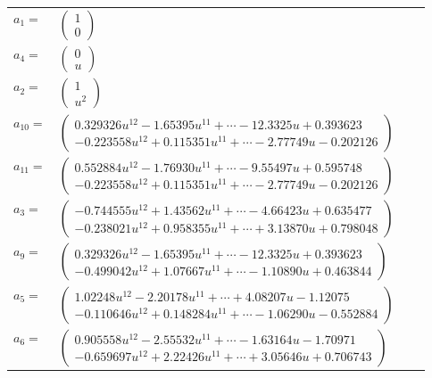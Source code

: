 \documentclass[1p]{elsarticle_modified}
\theoremstyle{definition}
\begin{document}
\begin{tabular}{m{7pt} m{180pt} m{7pt} m{180pt} }
\flushright $a_{1}=$&$\begin{pmatrix}1\\0\end{pmatrix}$ \\
\flushright $a_{4}=$&$\begin{pmatrix}0\\u\end{pmatrix}$ \\
\flushright $a_{2}=$&$\begin{pmatrix}1\\u^2\end{pmatrix}$ \\
\flushright $a_{10}=$&$\begin{pmatrix}0.329326 u^{12}-1.65395 u^{11}+\cdots-12.3325 u+0.393623\\-0.223558 u^{12}+0.115351 u^{11}+\cdots-2.77749 u-0.202126\end{pmatrix}$ \\
\flushright $a_{11}=$&$\begin{pmatrix}0.552884 u^{12}-1.76930 u^{11}+\cdots-9.55497 u+0.595748\\-0.223558 u^{12}+0.115351 u^{11}+\cdots-2.77749 u-0.202126\end{pmatrix}$ \\
\flushright $a_{3}=$&$\begin{pmatrix}-0.744555 u^{12}+1.43562 u^{11}+\cdots-4.66423 u+0.635477\\-0.238021 u^{12}+0.958355 u^{11}+\cdots+3.13870 u+0.798048\end{pmatrix}$ \\
\flushright $a_{9}=$&$\begin{pmatrix}0.329326 u^{12}-1.65395 u^{11}+\cdots-12.3325 u+0.393623\\-0.499042 u^{12}+1.07667 u^{11}+\cdots-1.10890 u+0.463844\end{pmatrix}$ \\
\flushright $a_{5}=$&$\begin{pmatrix}1.02248 u^{12}-2.20178 u^{11}+\cdots+4.08207 u-1.12075\\-0.110646 u^{12}+0.148284 u^{11}+\cdots-1.06290 u-0.552884\end{pmatrix}$ \\
\flushright $a_{6}=$&$\begin{pmatrix}0.905558 u^{12}-2.55532 u^{11}+\cdots-1.63164 u-1.70971\\-0.659697 u^{12}+2.22426 u^{11}+\cdots+3.05646 u+0.706743\end{pmatrix}$ \\

\end{tabular}
\end{document}
